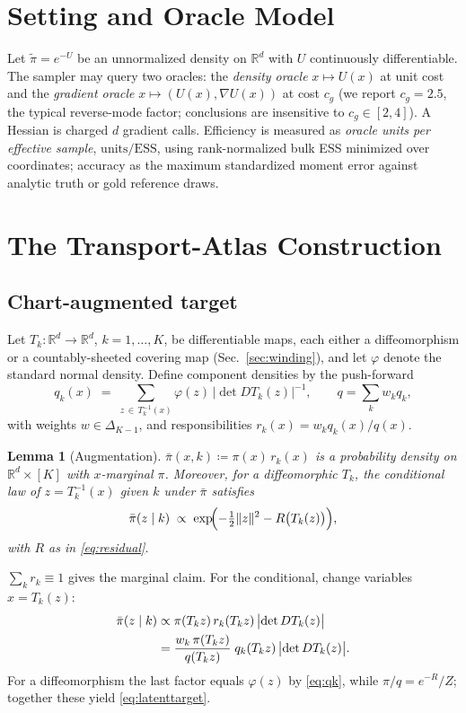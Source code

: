 \documentclass[10pt,journal,compsoc]{IEEEtran}
\newtheorem{lemma}{Lemma}
\newcommand{\R}{\mathbb{R}}
\begin{document}
\section{Setting and Oracle Model}\label{sec:setting}
Let $\tilde\pi=e^{-U}$ be an unnormalized density on $\R^d$ with $U$
continuously differentiable. The sampler may query two oracles: the
\emph{density oracle} $x\mapsto U(x)$ at unit cost and the \emph{gradient
oracle} $x\mapsto(U(x),\nabla U(x))$ at cost $c_g$ (we report $c_g=2.5$,
the typical reverse-mode factor; conclusions are insensitive to
$c_g\in[2,4]$). A Hessian is charged $d$ gradient calls. Efficiency is
measured as \emph{oracle units per effective sample},
$\mathrm{units/ESS}$, using rank-normalized bulk ESS \cite{vehtari2021}
minimized over coordinates; accuracy as the maximum standardized moment
error against analytic truth or gold reference draws.

\section{The Transport-Atlas Construction}\label{sec:construction}
\subsection{Chart-augmented target}
Let $T_k:\R^d\to\R^d$, $k=1,\dots,K$, be differentiable maps, each either a
diffeomorphism or a countably-sheeted covering map
(Sec.~\ref{sec:winding}), and let $\varphi$ denote the standard normal
density. Define component densities by the push-forward
\begin{equation}
q_k(x)\;=\;\sum_{z\,\in\,T_k^{-1}(x)}\varphi(z)\,\bigl|\det DT_k(z)\bigr|^{-1},
\qquad q=\textstyle\sum_k w_kq_k,
\label{eq:qk}
\end{equation}
with weights $w\in\Delta_{K-1}$, and responsibilities
$r_k(x)=w_kq_k(x)/q(x)$.

\begin{lemma}[Augmentation]\label{lem:aug}
$\bar\pi(x,k)\coloneqq\pi(x)\,r_k(x)$ is a probability density on
$\R^d\times[K]$ with $x$-marginal $\pi$. Moreover, for a diffeomorphic
$T_k$, the conditional law of $z=T_k^{-1}(x)$ given $k$ under $\bar\pi$
satisfies
\begin{equation}
\bar\pi(z\mid k)\;\propto\;
\exp\!\Bigl(-\tfrac12\|z\|^2 - R\bigl(T_k(z)\bigr)\Bigr),
\label{eq:latenttarget}
\end{equation}
with $R$ as in \eqref{eq:residual}.
\end{lemma}
\begin{IEEEproof}
$\sum_k r_k\equiv1$ gives the marginal claim. For the conditional, change
variables $x=T_k(z)$:
\begin{align}
\bar\pi(z\mid k)
&\propto \pi(T_kz)\,r_k(T_kz)\,\bigl|\det DT_k(z)\bigr|\notag\\
&= \frac{w_k\,\pi(T_kz)}{q(T_kz)}\;
   q_k(T_kz)\,\bigl|\det DT_k(z)\bigr|.\notag
\end{align}
For a diffeomorphism the last factor equals $\varphi(z)$ by \eqref{eq:qk},
while $\pi/q= e^{-R}/Z$; together these yield \eqref{eq:latenttarget}.
\end{IEEEproof}
\end{document}
